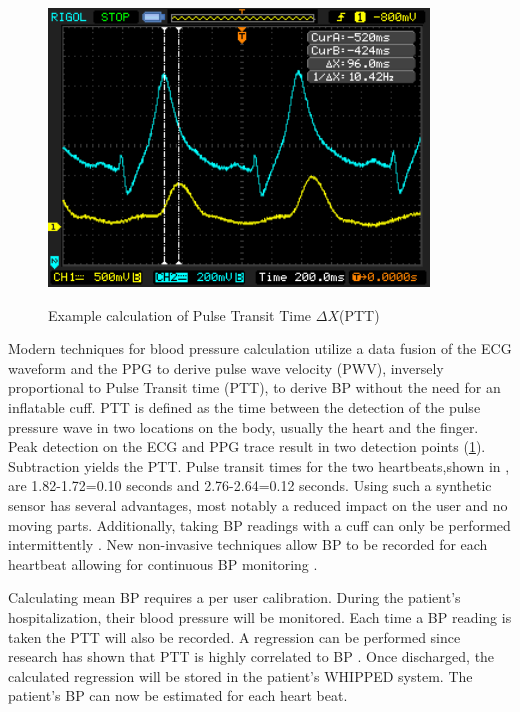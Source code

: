 \begin{figure}
	\begin{center}
		\label{fig:PTT_calc}
		\includegraphics[scale=1,width=0.9\textwidth]{Images/PTT_Calculation.png} 
		\caption{Example calculation of Pulse Transit Time $ \Delta X $(PTT)}
	\end{center}
\end{figure}

Modern techniques for blood pressure calculation utilize a data fusion of the ECG waveform and the PPG to derive pulse wave velocity (PWV), inversely proportional to Pulse Transit time (PTT), to derive BP without the need for an inflatable cuff.  PTT is defined as the time between the detection of the pulse pressure wave in two locations on the body, usually the heart and the finger. Peak detection on the ECG and PPG trace result in two detection points (\cref{fig:PTT_calc}). Subtraction yields the PTT. Pulse transit times for the two heartbeats,shown in \cite{fig:PPT_calc}, are 1.82-1.72=0.10 seconds and 2.76-2.64=0.12 seconds. Using such a synthetic sensor has several advantages, most notably a reduced impact on the user and no moving parts. Additionally, taking BP readings with a cuff can only be performed intermittently \cite{DeMey1995}. New non-invasive techniques allow BP to be recorded for each heartbeat allowing for continuous BP monitoring \cite{Gesche2012}. 

Calculating mean BP requires a per user calibration. During the patient's hospitalization, their blood pressure will be monitored. Each time a BP reading is taken the PTT will also be recorded. A regression can be performed since research has shown that PTT is highly correlated to BP \cite{Chan2001}. Once discharged, the calculated regression will be stored in the patient's WHIPPED system. The patient's BP can now be estimated for each heart beat.  


